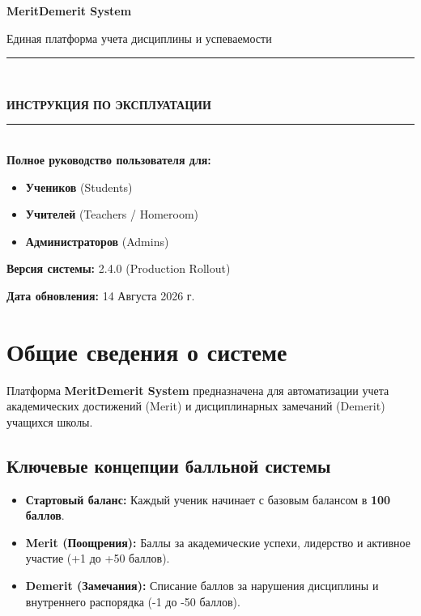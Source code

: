 \documentclass[12pt,a4paper]{article}
\begin{document}
\begin{titlepage}
    \centering
    \vspace*{1.5cm}
    
    {\Huge \bfseries \color{primaryPurple} MeritDemerit System \par}
    \vspace{0.5cm}
    { \Large Единая платформа учета дисциплины и успеваемости \par}
    
    \vspace{2cm}
    \rule{\linewidth}{0.5mm} \\[0.4cm]
    {\huge \bfseries ИНСТРУКЦИЯ ПО ЭКСПЛУАТАЦИИ \par}
    \rule{\linewidth}{0.5mm} \\[1.5cm]
    
    \Large
    \textbf{Полное руководство пользователя для:}\\[0.3cm]
    \begin{itemize}[label=$\bullet$, leftmargin=6cm]
        \item \textbf{Учеников} (Students)
        \item \textbf{Учителей} (Teachers / Homeroom)
        \item \textbf{Администраторов} (Admins)
    \end{itemize}
    
    \vfill
    
    {\large \textbf{Версия системы:} 2.4.0 (Production Rollout) \par}
    {\large \textbf{Дата обновления:} 14 Августа 2026 г. \par}
\end{titlepage}

\tableofcontents
\newpage

\section{Общие сведения о системе}

Платформа \textbf{MeritDemerit System} предназначена для автоматизации учета академических достижений (Merit) и дисциплинарных замечаний (Demerit) учащихся школы.

\subsection{Ключевые концепции балльной системы}
\begin{itemize}
    \item \textbf{Стартовый баланс:} Каждый ученик начинает с базовым балансом в \textbf{100 баллов}.
    \item \textbf{Merit (Поощрения):} Баллы за академические успехи, лидерство и активное участие (+1 до +50 баллов).
    \item \textbf{Demerit (Замечания):} Списание баллов за нарушения дисциплины и внутреннего распорядка (-1 до -50 баллов).
\end{itemize}
\end{document}

